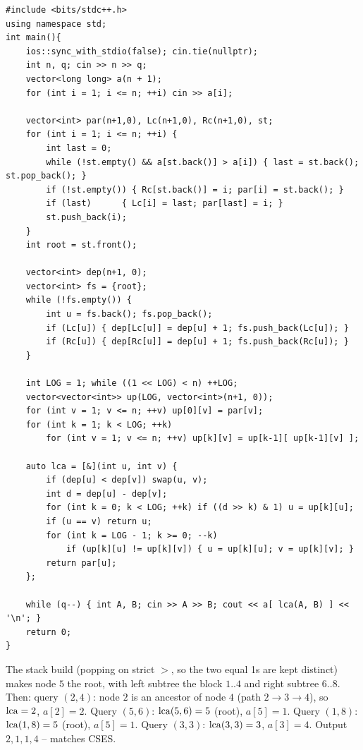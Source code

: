 \begin{lstlisting}[caption={Static Range Minimum Queries -- Cartesian build plus binary-lifting LCA (CSES 1647)}, label={lst:c26-rmq1647-soln}]
#include <bits/stdc++.h>
using namespace std;
int main(){
    ios::sync_with_stdio(false); cin.tie(nullptr);
    int n, q; cin >> n >> q;
    vector<long long> a(n + 1);
    for (int i = 1; i <= n; ++i) cin >> a[i];

    vector<int> par(n+1,0), Lc(n+1,0), Rc(n+1,0), st;
    for (int i = 1; i <= n; ++i) {
        int last = 0;
        while (!st.empty() && a[st.back()] > a[i]) { last = st.back(); st.pop_back(); }
        if (!st.empty()) { Rc[st.back()] = i; par[i] = st.back(); }
        if (last)      { Lc[i] = last; par[last] = i; }
        st.push_back(i);
    }
    int root = st.front();

    vector<int> dep(n+1, 0);
    vector<int> fs = {root};
    while (!fs.empty()) {
        int u = fs.back(); fs.pop_back();
        if (Lc[u]) { dep[Lc[u]] = dep[u] + 1; fs.push_back(Lc[u]); }
        if (Rc[u]) { dep[Rc[u]] = dep[u] + 1; fs.push_back(Rc[u]); }
    }

    int LOG = 1; while ((1 << LOG) < n) ++LOG;
    vector<vector<int>> up(LOG, vector<int>(n+1, 0));
    for (int v = 1; v <= n; ++v) up[0][v] = par[v];
    for (int k = 1; k < LOG; ++k)
        for (int v = 1; v <= n; ++v) up[k][v] = up[k-1][ up[k-1][v] ];

    auto lca = [&](int u, int v) {
        if (dep[u] < dep[v]) swap(u, v);
        int d = dep[u] - dep[v];
        for (int k = 0; k < LOG; ++k) if ((d >> k) & 1) u = up[k][u];
        if (u == v) return u;
        for (int k = LOG - 1; k >= 0; --k)
            if (up[k][u] != up[k][v]) { u = up[k][u]; v = up[k][v]; }
        return par[u];
    };

    while (q--) { int A, B; cin >> A >> B; cout << a[ lca(A, B) ] << '\n'; }
    return 0;
}
\end{lstlisting}

\begin{tracebox}
The stack build (popping on strict $>$, so the two equal 1s are kept distinct) makes node $5$ the root,
with left subtree the block $1..4$ and right subtree $6..8$. Then: query $(2,4)$: node $2$ is an ancestor
of node $4$ (path $2\to3\to4$), so $\operatorname{lca}=2$, $a[2]=2$. Query $(5,6)$: $\operatorname{lca}(5,6)=5$ (root), $a[5]=1$.
Query $(1,8)$: $\operatorname{lca}(1,8)=5$ (root), $a[5]=1$. Query $(3,3)$: $\operatorname{lca}(3,3)=3$, $a[3]=4$. Output $2,1,1,4$
-- matches CSES. \checkmark
\end{tracebox}

